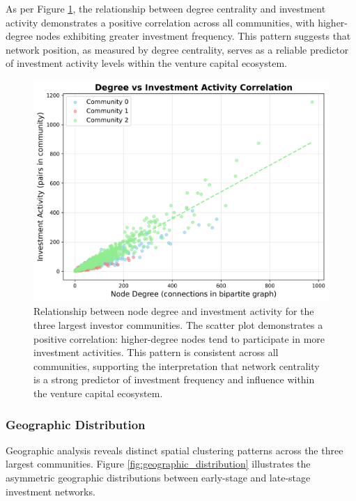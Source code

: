 As per Figure \ref{fig:degree_vs_activity}, the relationship between degree centrality and investment activity demonstrates a positive correlation across all communities, with higher-degree nodes exhibiting greater investment frequency. This pattern suggests that network position, as measured by degree centrality, serves as a reliable predictor of investment activity levels within the venture capital ecosystem.


\begin{figure}[htpb]
\centering
\includegraphics[width=1\textwidth]{../figures/us/degree_vs_investment_corr.png}
\caption{Relationship between node degree and investment activity for the three largest investor communities. The scatter plot demonstrates a positive correlation: higher-degree nodes tend to participate in more investment activities. This pattern is consistent across all communities, supporting the interpretation that network centrality is a strong predictor of investment frequency and influence within the venture capital ecosystem.}
\label{fig:degree_vs_activity}
\end{figure}

\subsubsection{Geographic Distribution}

Geographic analysis reveals distinct spatial clustering patterns across the three largest communities. Figure \ref{fig:geographic_distribution} illustrates the asymmetric geographic distributions between early-stage and late-stage investment networks.

